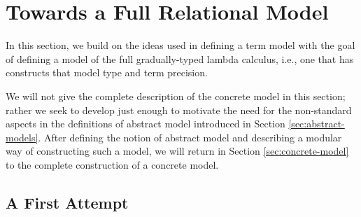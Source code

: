 \section{Towards a Full Relational Model}\label{sec:towards-relational-model}

In this section, we build on the ideas used in defining a term model with the
goal of defining a model of the full gradually-typed lambda calculus, i.e., one
that has constructs that model type and term precision.
%

We will not give the complete description of the concrete model in this section;
rather we seek to develop just enough to motivate the need for the non-standard
aspects in the definitions of abstract model introduced in Section
\ref{sec:abstract-models}. After defining the notion of abstract model and
describing a modular way of constructing such a model, we will return in Section
\ref{sec:concrete-model} to the complete construction of a concrete model.  

\subsection{A First Attempt}


